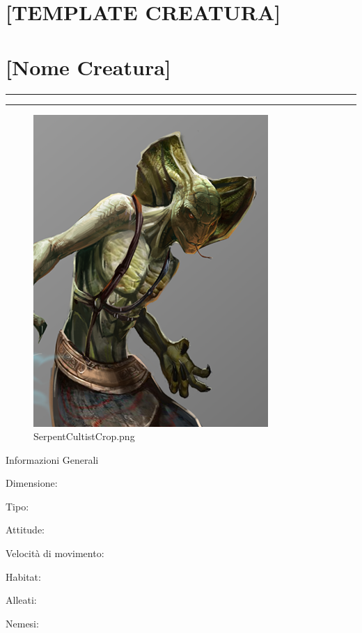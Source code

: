 \section{{[}TEMPLATE CREATURA{]}}\label{template-creatura}

\section{{[}Nome Creatura{]}}\label{nome-creatura}

\begin{center}\rule{0.5\linewidth}{0.5pt}\end{center}

\begin{center}\rule{0.5\linewidth}{0.5pt}\end{center}

\begin{figure}
\centering
\includegraphics{SerpentCultistCrop.png}
\caption{SerpentCultistCrop.png}
\end{figure}

Informazioni Generali

Dimensione:

Tipo:

Attitude:

Velocità di movimento:

Habitat:

Alleati:

Nemesi:

